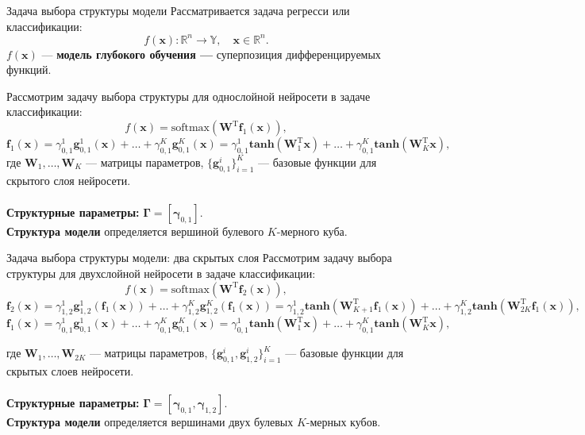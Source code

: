 \documentclass[usenames,dvipsnames,11pt,pdf,utf8,russian,aspectratio=169]{beamer}
\begin{document}
\begin{frame}{Задача выбора структуры модели}
Рассматривается задача регресси или классификации:
\[
    f(\mathbf{x}): \mathbb{R}^n \to \mathbb{Y}, \quad \mathbf{x} \in \mathbb{R}^n.
\]
$f(\mathbf{x})$ --- \textbf{модель глубокого обучения --- } суперпозиция дифференцируемых функций.

Рассмотрим задачу выбора структуры для однослойной нейросети в задаче классификации:
\[
    f(\mathbf{x}) = \text{softmax}\left(\mathbf{W}^\text{T}\mathbf{f}_1(\mathbf{x})\right),
\]
\[
\mathbf{f}_1(\mathbf{x}) = {\gamma}_{0,1}^{1}\mathbf{g}_{0,1}^{1}(\mathbf{x})+\dots+{\gamma}_{0,1}^{K}\mathbf{g}_{0,1}^{K}(\mathbf{x})= {\gamma}_{0,1}^{1}\textbf{tanh}(\mathbf{W}_1^\text{T}\mathbf{x}) + \dots +  {\gamma}_{0,1}^{K}\textbf{tanh}(\mathbf{W}_K^\text{T}\mathbf{x}),
\]
где $\mathbf{W}_1, \dots, \mathbf{W}_K$ --- матрицы параметров, $\{\mathbf{g}^{i}_{0,1}\}_{i=1}^K$ --- базовые функции для скрытого слоя нейросети.~\\~\\

\textbf{Структурные параметры:}  $\boldsymbol{\Gamma} = [\boldsymbol{\gamma}_{0,1}]$.\\
\textbf{Структура модели} определяется вершиной булевого $K$-мерного куба.

\end{frame}

\begin{frame}{Задача выбора структуры модели: два скрытых слоя}
Рассмотрим задачу выбора структуры для двухслойной нейросети в задаче классификации:
\[
    f(\mathbf{x}) = \text{softmax}\left(\mathbf{W}^\text{T}\mathbf{f}_2(\mathbf{x})\right),
\]
\[
\mathbf{f}_2(\mathbf{x}) = {\gamma}_{1,2}^{1}\mathbf{g}_{1,2}^{1}(\mathbf{f}_1(\mathbf{x}))+\dots+{\gamma}_{1,2}^{K}\mathbf{g}_{1,2}^{K}(\mathbf{f}_1(\mathbf{x}))= {\gamma}_{1,2}^{1}\textbf{tanh}(\mathbf{W}_{K+1}^\text{T}\mathbf{f}_1(\mathbf{x})) + \dots +  {\gamma}_{1,2}^{K}\textbf{tanh}(\mathbf{W}_{2K}^\text{T}\mathbf{f}_1(\mathbf{x})),
\]
\[
\mathbf{f}_1(\mathbf{x}) = {\gamma}_{0,1}^{1}\mathbf{g}_{0,1}^{1}(\mathbf{x})+\dots+{\gamma}_{0,1}^{K}\mathbf{g}_{0,1}^{K}(\mathbf{x})= {\gamma}_{0,1}^{1}\textbf{tanh}(\mathbf{W}_1^\text{T}\mathbf{x}) + \dots +  {\gamma}_{0,1}^{K}\textbf{tanh}(\mathbf{W}_K^\text{T}\mathbf{x}),
\]

где $\mathbf{W}_1, \dots, \mathbf{W}_{2K}$ --- матрицы параметров, $\{\mathbf{g}^{i}_{0,1},\mathbf{g}^{i}_{1,2}\}_{i=1}^K$ --- базовые функции для скрытых слоев нейросети.~\\~\\

\textbf{Структурные параметры:} $\boldsymbol{\Gamma} = [\boldsymbol{\gamma}_{0,1}, \boldsymbol{\gamma}_{1,2}]$.\\
\textbf{Структура модели} определяется вершинами двух булевых $K$-мерных кубов.

\end{frame}
\end{document}

